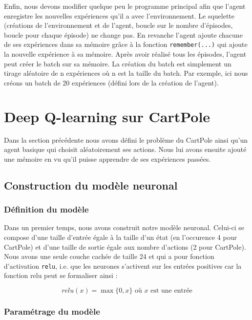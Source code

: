 \documentclass[10pt,a4paper]{article}
\begin{document}
Enfin, nous devons modifier quelque peu le programme principal afin que l'agent enregistre les nouvelles expériences qu'il a avec l'environnement. Le squelette (créations de l'environnement et de l'agent, boucle sur le nombre d'épisodes, boucle pour chaque épisode) ne change pas. En revanche l'agent ajoute chacune de ses expériences dans sa mémoire grâce à la fonction \lstinline{remember(...)} qui ajoute la nouvelle expérience à sa mémoire. Après avoir réalisé tous les épisodes, l'agent peut créer le batch sur sa mémoire. La création du batch est simplement un tirage aléatoire de n expériences où n est la taille du batch. Par exemple, ici nous créons un batch de 20 expériences (défini lors de la création de l'agent).

\section{Deep Q-learning sur CartPole}

Dans la section précédente nous avons défini le problème du CartPole ainsi qu'un agent basique qui choisit aléatoirement ses actions. Nous lui avons ensuite ajouté  une mémoire en vu qu'il puisse apprendre de ses expériences passées.

\subsection{Construction du modèle neuronal}

\subsubsection{Définition du modèle}

Dans un premier temps, nous avons construit notre modèle neuronal. Celui-ci se compose d'une taille d'entrée égale à la taille d'un état (en l'occurence 4 pour CartPole) et d'une taille de sortie égale aux nombre d'actions (2 pour CartPole). Nous avons une seule couche cachée de taille 24 et qui a pour fonction d'activation \lstinline{relu}, i.e. que les neurones s'activent sur les entrées positives car la fonction relu peut se formaliser ainsi :

$$relu(x) = \max \{0, x\} \text{ où } x \text{ est une entrée}$$

\subsubsection{Paramétrage du modèle}
\end{document}
